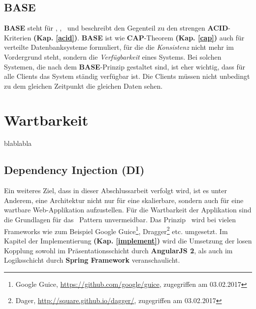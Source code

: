 %



\subsection{BASE}\label{base}
\textbf{BASE} steht für \BAse, \baSe, \basE\ und beschreibt den Gegenteil zu den strengen \textbf{ACID}-Kriterien \textbf{(Kap. \ref{acid})}. \textbf{BASE} ist wie \textbf{CAP}-Theorem \textbf{(Kap. \ref{cap})} auch für verteilte Datenbanksysteme formuliert, für die die \textit{Konsistenz} nicht mehr im Vordergrund steht, sondern die \textit{Verfügbarkeit} eines Systems. Bei solchen Systemen, die nach dem \textbf{BASE}-Prinzip gestaltet sind, ist eher wichtig, dass für alle Clients das System ständig verfügbar ist. Die Clients müssen nicht unbedingt zu dem gleichen Zeitpunkt die gleichen Daten sehen.

\section{Wartbarkeit}\label{maintenance}

blablabla

\subsection{Dependency Injection (DI)}

Ein weiteres Ziel, dass in dieser Abschlussarbeit verfolgt wird, ist es unter Anderem, eine Architektur nicht nur für eine skalierbare, sondern auch für eine wartbare Web-Applikation aufzustellen. Für die Wartbarkeit der Applikation sind die Grundlagen für das \di\ Pattern unvermeidbar. Das Prinzip \di\ wird bei vielen Frameworks wie zum Beispiel Google Guice\footnote{Google Guice, \url{https://github.com/google/guice}, zugegriffen am 03.02.2017}, Dragger\footnote{Dager, \url{http://square.github.io/dagger/}, zugegriffen am 03.02.2017} etc. umgesetzt. Im Kapitel der Implementierung \textbf{(Kap. \ref{implement})} wird die Umsetzung der losen Kopplung sowohl im Präsentationsschicht durch \textbf{AngularJS 2}, als auch im Logiksschicht durch \textbf{Spring Framework} veranschaulicht.

